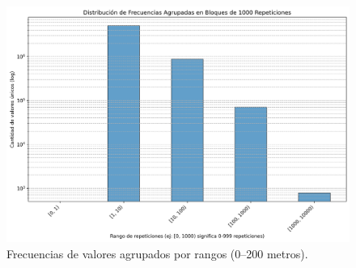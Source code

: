 \begin{figure}[H]
    \centering
    \includegraphics[width=\textwidth]{img/histograma_frecuencias_agrupadas_1000_dup.png}
    \caption{Frecuencias de valores agrupados por rangos (0–200 metros).}
    \label{fig:accuracy_histogram}
\end{figure}

